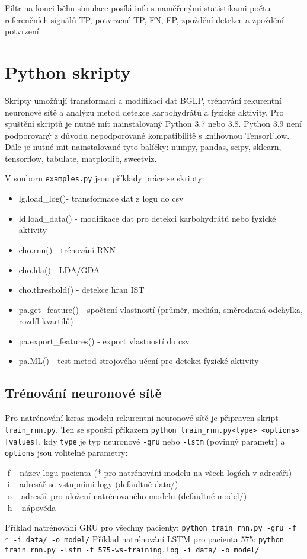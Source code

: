 \noindent Filtr na konci běhu simulace posílá info s naměřenými statistikami počtu referenčních signálů TP, potvrzené TP, FN, FP, zpoždění detekce a zpoždění potvrzení.

\section*{Python skripty}

Skripty umožňují transformaci a modifikaci dat BGLP, trénování
rekurentní neuronové sítě a analýzu metod detekce karbohydrátů a fyzické
aktivity. Pro spuštění skriptů je nutné mít nainstalovaný Python 3.7
nebo 3.8. Python 3.9 není podporovaný z důvodu nepodporované
kompatibilitě s knihovnou TensorFlow. Dále je nutné mít nainstalované
tyto balíčky: numpy, pandas, scipy, sklearn, tensorflow, tabulate, matplotlib, sweetviz.

V souboru \texttt{examples.py} jsou příklady práce se skripty:

\begin{itemize}
\itemsep1pt\parskip0pt
\item lg.load\_log()- transformace dat z logu do csv
\item ld.load\_data() - modifikace dat pro detekci karbohydrátů nebo fyzické aktivity
\item cho.rnn() - trénování RNN
\item cho.lda() - LDA/GDA
\item cho.threshold() - detekce hran IST
\item pa.get\_feature() - spočtení vlastností (průměr, medián, směrodatná odchylka, rozdíl kvartilů)
\item pa.export\_features() - export vlastností do csv
\item pa.ML() - test metod strojového učení pro detekci fyzické aktivity
\end{itemize}

\subsection*{Trénování neuronové sítě}

Pro natrénování keras modelu rekurentní neuronové sítě je připraven skript \texttt{train\_rnn.py}. Ten se spouští příkazem \texttt{python train\_rnn.py\textless{}type\textgreater{} \textless{}options\textgreater{} {[}values{]}}, kdy \texttt{type} je typ neuronové \texttt{-gru} nebo \texttt{-lstm} (povinný parametr) a \texttt{options} jsou volitelné parametry: 

\noindent -f ~ název logu pacienta (* pro natrénování modelu na všech logách v adresáři)\\
 -i ~ adresář se vstupními logy (defaultně data/)\\
 -o ~ adresář pro uložení natrénovaného modelu (defaultně model/)\\
 -h ~ nápověda

\noindent Příklad natrénování GRU pro všechny pacienty: \texttt{python train\_rnn.py -gru -f * -i data/ -o model/} Příklad natrénování LSTM pro pacienta 575: \texttt{python train\_rnn.py -lstm -f 575-ws-training.log -i data/ -o model/}